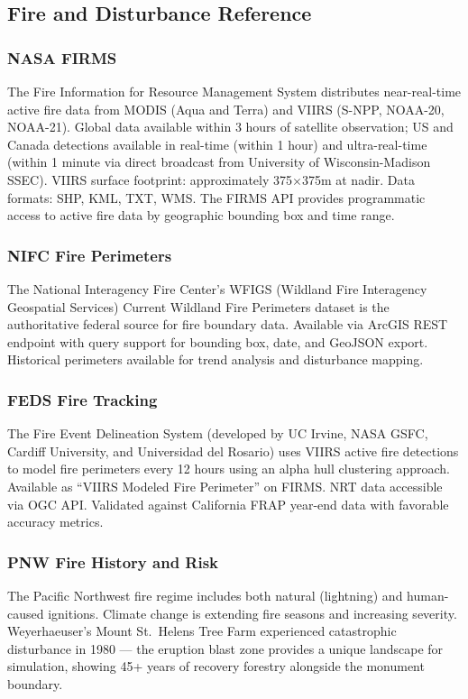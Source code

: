 \documentclass[11pt,letterpaper]{article}
\begin{document}
\subsection{Fire and Disturbance Reference}

\subsubsection{NASA FIRMS}
The Fire Information for Resource Management System distributes near-real-time active fire data from MODIS (Aqua and Terra) and VIIRS (S-NPP, NOAA-20, NOAA-21). Global data available within 3 hours of satellite observation; US and Canada detections available in real-time (within 1 hour) and ultra-real-time (within 1 minute via direct broadcast from University of Wisconsin-Madison SSEC). VIIRS surface footprint: approximately 375$\times$375m at nadir. Data formats: SHP, KML, TXT, WMS. The FIRMS API provides programmatic access to active fire data by geographic bounding box and time range.

\subsubsection{NIFC Fire Perimeters}
The National Interagency Fire Center's WFIGS (Wildland Fire Interagency Geospatial Services) Current Wildland Fire Perimeters dataset is the authoritative federal source for fire boundary data. Available via ArcGIS REST endpoint with query support for bounding box, date, and GeoJSON export. Historical perimeters available for trend analysis and disturbance mapping.

\subsubsection{FEDS Fire Tracking}
The Fire Event Delineation System (developed by UC Irvine, NASA GSFC, Cardiff University, and Universidad del Rosario) uses VIIRS active fire detections to model fire perimeters every 12 hours using an alpha hull clustering approach. Available as ``VIIRS Modeled Fire Perimeter'' on FIRMS. NRT data accessible via OGC API. Validated against California FRAP year-end data with favorable accuracy metrics.

\subsubsection{PNW Fire History and Risk}
The Pacific Northwest fire regime includes both natural (lightning) and human-caused ignitions. Climate change is extending fire seasons and increasing severity. Weyerhaeuser's Mount St.\ Helens Tree Farm experienced catastrophic disturbance in 1980 --- the eruption blast zone provides a unique landscape for simulation, showing 45+ years of recovery forestry alongside the monument boundary.
\end{document}
